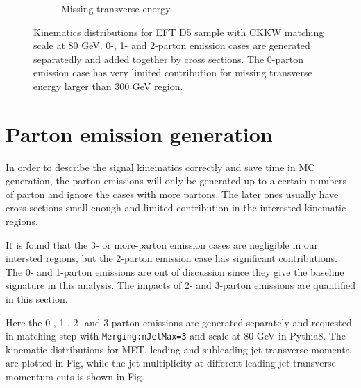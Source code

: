 \begin{figure} [thbp]
\begin{subfigure}{0.48\linewidth}
    \caption{Missing transverse energy}
  \end{subfigure}
  \caption{Kinematics distributions for EFT D5 sample with CKKW matching scale at 80 GeV. 0-, 1- and 2-parton emission cases are generated separatedly and added together by cross sections. The 0-parton emission case has very limited contribution for missing transverse energy larger than 300 GeV region.}
  \label{fig:Kine_D5_80}
\end{figure}

\section{Parton emission generation}
\label{sec:monojet_parton_emission}
In order to describe the signal kinematics correctly and save time in MC generation, the parton emissions will only be generated up to a certain numbers of parton and ignore the cases with more partons. The later ones usually have cross sections small enough and limited contribution in the interested kinematic regions.

It is found that the 3- or more-parton emission cases are negligible in our intersted regions, but the 2-parton emission case has significant contributions. The 0- and 1-parton emissions are out of discussion since they give the baseline signature in this analysis. The impacts of 2- and 3-parton emissions are quantified in this section.

Here the 0-, 1-, 2- and 3-parton emissions are generated separately and requested in matching step with \texttt{Merging:nJetMax=3} and scale at 80 GeV in Pythia8. The kinematic distributions for MET, leading and subleading jet transverse momenta are plotted in Fig, while the jet multiplicity at different leading jet transverse momentum cuts is shown in Fig.

